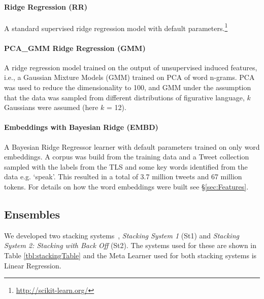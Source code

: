 \documentclass[11pt,letterpaper]{article}
\begin{document}
\paragraph{Ridge Regression ({\sc RR})} A standard supervised ridge regression model with default parameters.\footnote{\url{http://scikit-learn.org/}}

\paragraph{PCA\_GMM Ridge Regression ({\sc GMM})} A ridge regression model trained on the output of 
unsupervised induced features, i.e., a Gaussian Mixture Models (GMM) trained on PCA of word n-grams.
PCA was used to reduce the dimensionality to 100, and GMM under the assumption that the data was sampled from different distributions of figurative language, $k$ Gaussians were assumed (here $k$ = 12). 
\paragraph{Embeddings with Bayesian Ridge ({\sc EMBD})} A Bayesian Ridge Regressor learner with default parameters trained on only word embeddings. 
A corpus was build from the training data and a Tweet collection sampled with the labels from the TLS and some key words identified from the data e.g. `speak'. 
This resulted in a total of 3.7 million tweets and 67 million tokens. 
For details on how the word embeddings were built see \S\ref{sec:Features}.



\subsection{Ensembles}
We developed two stacking systems~\cite{Wolpert:1992}, {\it Stacking System 1} ({\sc St1}) and {\it Stacking System 2: Stacking with Back Off} ({\sc St2}). The systems used for these are shown in Table  \ref{tbl:stackingTable} and the Meta Learner used for both stacking systems is Linear Regression.
\end{document}
